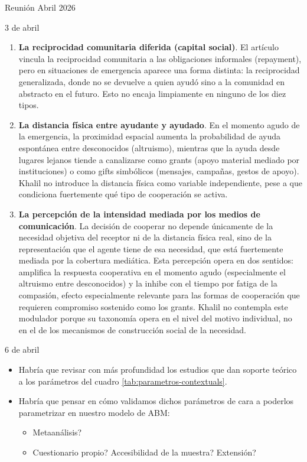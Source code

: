 \documentclass[a4paper,11pt]{article}
\begin{document}
\begin{seccionbox}[violetasuave]{Reunión Abril 2026}
\begin{updateo}{3 de abril}
\begin{itemize}
\begin{enumerate}
                    \item \textbf{La reciprocidad comunitaria diferida (capital social)}. El artículo vincula la reciprocidad comunitaria a las obligaciones informales (repayment), pero en situaciones de emergencia aparece una forma distinta: la reciprocidad generalizada, donde no se devuelve a quien ayudó sino a la comunidad en abstracto en el futuro. Esto no encaja limpiamente en ninguno de los diez tipos.
                    \item \textbf{La distancia física entre ayudante y ayudado}. En el momento agudo de la emergencia, la proximidad espacial aumenta la probabilidad de ayuda espontánea entre desconocidos (altruismo), mientras que la ayuda desde lugares lejanos tiende a canalizarse como grants (apoyo material mediado por instituciones) o como gifts simbólicos (mensajes, campañas, gestos de apoyo). Khalil no introduce la distancia física como variable independiente, pese a que condiciona fuertemente qué tipo de cooperación se activa.
                    \item \textbf{La percepción de la intensidad mediada por los medios de comunicación}.  La decisión de cooperar no depende únicamente de la necesidad objetiva del receptor ni de la distancia física real, sino de la representación que el agente tiene de esa necesidad, que está fuertemente mediada por la cobertura mediática. Esta percepción opera en dos sentidos: amplifica la respuesta cooperativa en el momento agudo (especialmente el altruismo entre desconocidos) y la inhibe con el tiempo por fatiga de la compasión, efecto especialmente relevante para las formas de cooperación que requieren compromiso sostenido como los grants. Khalil no contempla este modulador porque su taxonomía opera en el nivel del motivo individual, no en el de los mecanismos de construcción social de la necesidad.
                \end{enumerate}
            \end{itemize}
        \end{updateo}
        \begin{updateo}{6 de abril}
            \begin{itemize}
                \item Habría que revisar con más profundidad los estudios que dan soporte teórico a los parámetros del cuadro \ref{tab:parametros-contextuals}.
                \item Habría que pensar en cómo validamos dichos parámetros de cara a poderlos parametrizar en nuestro modelo de ABM:
                    \begin{itemize}
                        \item Metaanálisis?
                        \item Cuestionario propio? Accesibilidad de la muestra? Extensión? 
                    \end{itemize}
            \end{itemize}
        \end{updateo} 
       
        
    \end{seccionbox}
\end{document}
